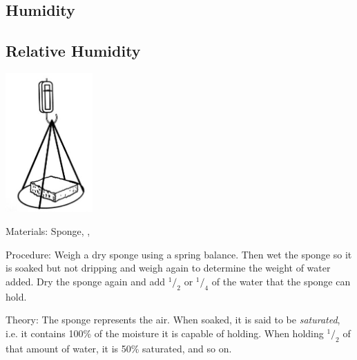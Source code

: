 \begin{multicols}{2}

\section*{Humidity} 


\subsection{Relative Humidity} 

\begin{center}
\includegraphics[width=0.25\textwidth]{./img/rel-humidity.jpg}
\end{center}

\begin{description*}
\item[Materials:]{Sponge, , }
\item[Procedure:]{Weigh a dry sponge using a spring balance. Then wet the sponge so it is soaked but not dripping and weigh again to determine the weight of water added. Dry the sponge again and add $^1/_2$ or $^1/_4$ of the water that the sponge can hold. }
\item[Theory:]{The sponge represents the air. When soaked, it is said to be \emph{saturated}, i.e. it contains 100\% of the moisture it is capable of holding. When holding $^1/_2$ of that amount of water, it is 50\% saturated, and so on.}
\end{description*}


\end{multicols}
